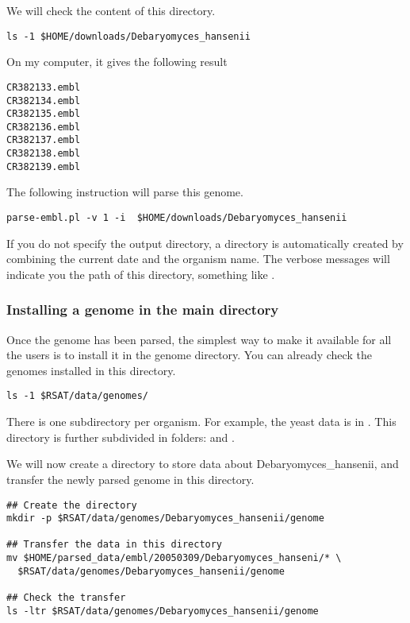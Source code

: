 We will check the content of this directory.

\begin{verbatim}
ls -1 $HOME/downloads/Debaryomyces_hansenii
\end{verbatim}

On my computer, it gives the following result

\begin{verbatim}
CR382133.embl
CR382134.embl
CR382135.embl
CR382136.embl
CR382137.embl
CR382138.embl
CR382139.embl
\end{verbatim}

The following instruction will parse this genome.

\begin{verbatim}
parse-embl.pl -v 1 -i  $HOME/downloads/Debaryomyces_hansenii
\end{verbatim}

If you do not specify the output directory, a directory is
automatically created by combining the current date and the organism
name.  The verbose messages will indicate you the path of this
directory, something like
.


\subsubsection{Installing a genome in the main \RSAT directory}

Once the genome has been parsed, the simplest way to make it available
 for all the users is to install it in the \RSAT genome directory. You
 can already check the genomes installed in this directory.

\begin{verbatim}
ls -1 $RSAT/data/genomes/
\end{verbatim}

There is one subdirectory per organism. For example, the yeast data is
 in . This
 directory is further subdivided in folders:  and
 .

We will now create a directory to store data about
 Debaryomyces\_hansenii, and transfer the newly parsed genome in this
 directory.

\begin{verbatim}
## Create the directory
mkdir -p $RSAT/data/genomes/Debaryomyces_hansenii/genome

## Transfer the data in this directory
mv $HOME/parsed_data/embl/20050309/Debaryomyces_hanseni/* \
  $RSAT/data/genomes/Debaryomyces_hansenii/genome

## Check the transfer
ls -ltr $RSAT/data/genomes/Debaryomyces_hansenii/genome
\end{verbatim}

